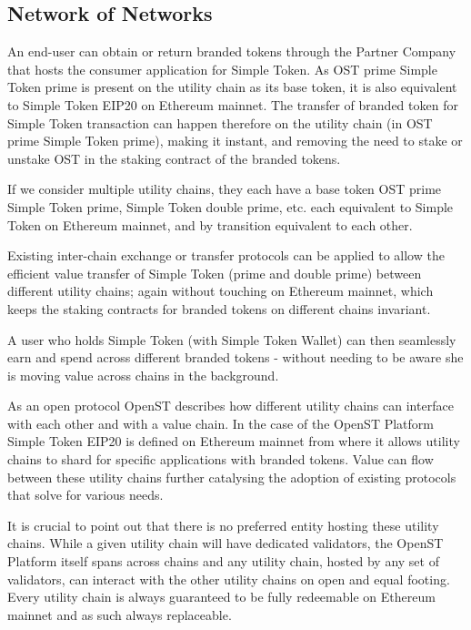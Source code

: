 \documentclass[12pt,a4paper, twocolumn]{article}
\begin{document}
\subsection{Network of Networks}
An end-user can obtain or return branded tokens through the Partner Company that hosts the consumer application for Simple Token. As OST prime Simple Token prime is present on the utility chain as its base token, it is also equivalent to Simple Token EIP20 on Ethereum mainnet.  The transfer of branded token for Simple Token transaction can happen therefore on the utility chain (in OST prime Simple Token prime), making it instant, and removing the need to stake or unstake OST in the staking contract of the branded tokens. \par
If we consider multiple utility chains, they each have a base token OST prime Simple Token prime, Simple Token double prime, etc. each equivalent to Simple Token on Ethereum mainnet, and by transition equivalent to each other. \par
Existing inter-chain exchange or transfer protocols can be applied to allow the efficient value transfer of Simple Token (prime and double prime) between different utility chains; again without touching on Ethereum mainnet, which keeps the staking contracts for branded tokens on different chains invariant. \par
A user who holds Simple Token (with Simple Token Wallet) can then seamlessly earn and spend across different branded tokens - without needing to be aware she is moving value across chains in the background. \par
As an open protocol OpenST describes how different utility chains can interface with each other and with a value chain.  In the case of the OpenST Platform Simple Token EIP20 is defined on Ethereum mainnet from where it allows utility chains to shard for specific applications with branded tokens.  Value can flow between these utility chains further catalysing the adoption of existing protocols that solve for various needs.\par
It is crucial to point out that there is no preferred entity hosting these utility chains.  While a given utility chain will have dedicated validators, the OpenST Platform itself spans across chains and any utility chain, hosted by any set of validators, can interact with the other utility chains on open and equal footing.  Every utility chain is always guaranteed to be fully redeemable on Ethereum mainnet and as such always replaceable. \par
\end{document}
